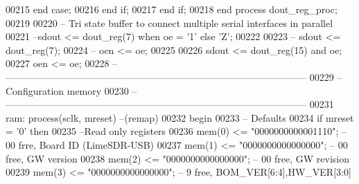 \begin{DoxyCode}
00215                 \textcolor{keywordflow}{end} \textcolor{keywordflow}{case};
00216             \textcolor{keywordflow}{end} \textcolor{keywordflow}{if};               
00217         \textcolor{keywordflow}{end} \textcolor{keywordflow}{if};
00218     \textcolor{keywordflow}{end} \textcolor{keywordflow}{process} \textcolor{vhdlchar}{dout\_reg\_proc};
00219     
00220 \textcolor{keyword}{    -- Tri state buffer to connect multiple serial interfaces in parallel}
00221 \textcolor{keyword}{    --sdout <= dout\_reg(7) when oe = '1' else 'Z';}
00222 
00223 \textcolor{keyword}{--  sdout <= dout\_reg(7);}
00224 \textcolor{keyword}{--  oen <= oe;}
00225 
00226     \textcolor{vhdlchar}{sdout} \textcolor{vhdlchar}{<=} \textcolor{vhdlchar}{dout_reg}\textcolor{vhdlchar}{(}\textcolor{vhdllogic}{}\textcolor{vhdllogic}{15}\textcolor{vhdlchar}{)} \textcolor{keywordflow}{and} \textcolor{vhdlchar}{oe};
00227     \textcolor{vhdlchar}{oen} \textcolor{vhdlchar}{<=} \textcolor{vhdlchar}{oe};
00228 \textcolor{keyword}{    -- ---------------------------------------------------------------------------------------------}
00229 \textcolor{keyword}{    -- Configuration memory}
00230 \textcolor{keyword}{    -- --------------------------------------------------------------------------------------------- }
00231     ram: \textcolor{keywordflow}{process}(sclk, mreset)\textcolor{keyword}{ --(remap)}
00232 \textcolor{vhdlkeyword}{    begin}
00233 \textcolor{keyword}{        -- Defaults}
00234         \textcolor{keywordflow}{if} \textcolor{vhdlchar}{mreset} \textcolor{vhdlchar}{=} \textcolor{vhdlchar}{'}\textcolor{vhdllogic}{}\textcolor{vhdllogic}{0}\textcolor{vhdlchar}{'} \textcolor{keywordflow}{then}    
00235 \textcolor{keyword}{            --Read only registers}
00236             \textcolor{vhdlchar}{mem}\textcolor{vhdlchar}{(}\textcolor{vhdllogic}{}\textcolor{vhdllogic}{0}\textcolor{vhdlchar}{)}  \textcolor{vhdlchar}{<=} \textcolor{vhdllogic}{"0000000000001110"};\textcolor{keyword}{ -- 00 frre, Board ID (LimeSDR-USB)}
00237             \textcolor{vhdlchar}{mem}\textcolor{vhdlchar}{(}\textcolor{vhdllogic}{}\textcolor{vhdllogic}{1}\textcolor{vhdlchar}{)}  \textcolor{vhdlchar}{<=} \textcolor{vhdllogic}{"0000000000000000"};\textcolor{keyword}{ -- 00 free, GW version}
00238             \textcolor{vhdlchar}{mem}\textcolor{vhdlchar}{(}\textcolor{vhdllogic}{}\textcolor{vhdllogic}{2}\textcolor{vhdlchar}{)}  \textcolor{vhdlchar}{<=} \textcolor{vhdllogic}{"0000000000000000"};\textcolor{keyword}{ -- 00 free, GW revision}
00239             \textcolor{vhdlchar}{mem}\textcolor{vhdlchar}{(}\textcolor{vhdllogic}{}\textcolor{vhdllogic}{3}\textcolor{vhdlchar}{)}  \textcolor{vhdlchar}{<=} \textcolor{vhdllogic}{"0000000000000000"};\textcolor{keyword}{ --  9 free, BOM\_VER[6:4],HW\_VER[3:0]}

\end{DoxyCode}
